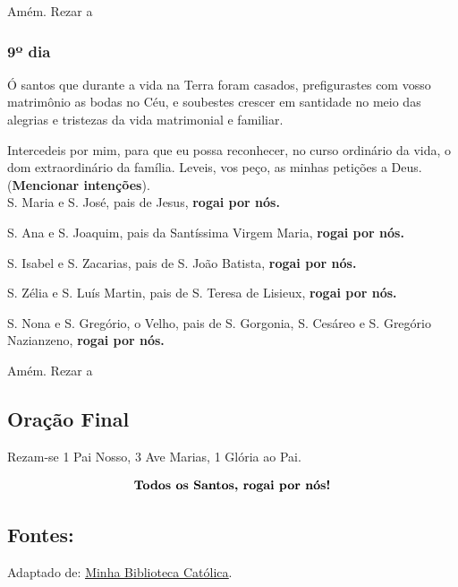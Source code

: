 \documentclass[a4paper,14pt]{extarticle} \usepackage[utf8]{inputenc}
\begin{document}
Amém. Rezar a 

\subsubsection{9º dia}

Ó santos que durante a vida na Terra foram casados, prefigurastes com vosso matrimônio as bodas no Céu, e soubestes crescer em santidade no meio das alegrias e tristezas da vida matrimonial e familiar.

Intercedeis por mim, para que eu possa reconhecer, no curso ordinário da vida, o dom extraordinário da família. Leveis, vos peço, as minhas petições a Deus. (\textbf{Mencionar intenções}).\\

S. Maria e S. José, pais de Jesus, \textbf{rogai por nós.}

S. Ana e S. Joaquim, pais da Santíssima Virgem Maria, \textbf{rogai por nós.}

S. Isabel e S. Zacarias, pais de S. João Batista, \textbf{rogai por nós.}

S. Zélia e S. Luís Martin, pais de S. Teresa de Lisieux, \textbf{rogai por nós.}

S. Nona e S. Gregório, o Velho, pais de S. Gorgonia, S. Cesáreo e S. Gregório Nazianzeno, \textbf{rogai por nós.}

Amém. Rezar a 

\subsection{Oração Final} \label{oracao-final}

\begin{center}
  Rezam-se 1 Pai Nosso, 3 Ave Marias, 1 Glória ao Pai.
\end{center}

\[
\textbf{Todos os Santos, \textbf{rogai por nós!}}
\]

\vfill

\begin{center}
\subsection*{Fontes:}
Adaptado de: \underline{\href{https://bibliotecacatolica.com.br/blog/novenas/novena-de-todos-os-santos/}{Minha Biblioteca Católica}}.
\end{center}
\end{document}
